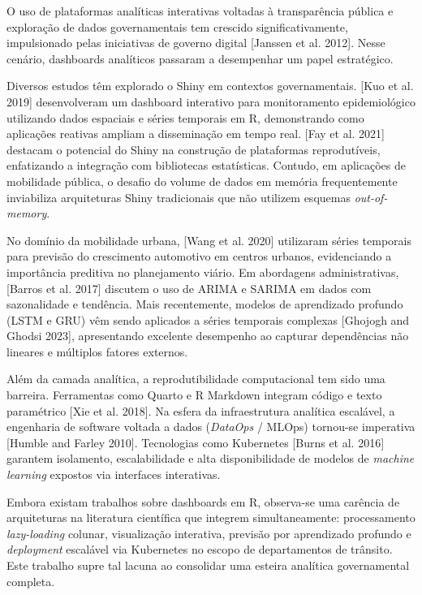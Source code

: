 \documentclass[12pt]{article}
\begin{document}
O uso de plataformas analíticas interativas voltadas à transparência pública e exploração de dados governamentais tem crescido significativamente, impulsionado pelas iniciativas de governo digital [Janssen et al. 2012]. Nesse cenário, dashboards analíticos passaram a desempenhar um papel estratégico.

Diversos estudos têm explorado o Shiny em contextos governamentais. [Kuo et al. 2019] desenvolveram um dashboard interativo para monitoramento epidemiológico utilizando dados espaciais e séries temporais em R, demonstrando como aplicações reativas ampliam a disseminação em tempo real. [Fay et al. 2021] destacam o potencial do Shiny na construção de plataformas reprodutíveis, enfatizando a integração com bibliotecas estatísticas. Contudo, em aplicações de mobilidade pública, o desafio do volume de dados em memória frequentemente inviabiliza arquiteturas Shiny tradicionais que não utilizem esquemas \textit{out-of-memory}.

No domínio da mobilidade urbana, [Wang et al. 2020] utilizaram séries temporais para previsão do crescimento automotivo em centros urbanos, evidenciando a importância preditiva no planejamento viário. Em abordagens administrativas, [Barros et al. 2017] discutem o uso de ARIMA e SARIMA em dados com sazonalidade e tendência. Mais recentemente, modelos de aprendizado profundo (LSTM e GRU) vêm sendo aplicados a séries temporais complexas [Ghojogh and Ghodsi 2023], apresentando excelente desempenho ao capturar dependências não lineares e múltiplos fatores externos.

Além da camada analítica, a reprodutibilidade computacional tem sido uma barreira. Ferramentas como Quarto e R Markdown integram código e texto paramétrico [Xie et al. 2018]. Na esfera da infraestrutura analítica escalável, a engenharia de software voltada a dados (\textit{DataOps} / MLOps) tornou-se imperativa [Humble and Farley 2010]. Tecnologias como Kubernetes [Burns et al. 2016] garantem isolamento, escalabilidade e alta disponibilidade de modelos de \textit{machine learning} expostos via interfaces interativas.

\newpage
Embora existam trabalhos sobre dashboards em R, observa-se uma carência de arquiteturas na literatura científica que integrem simultaneamente: processamento \textit{lazy-loading} colunar, visualização interativa, previsão por aprendizado profundo e \textit{deployment} escalável via Kubernetes no escopo de departamentos de trânsito. Este trabalho supre tal lacuna ao consolidar uma esteira analítica governamental completa.
\end{document}
